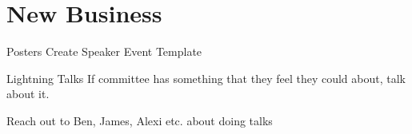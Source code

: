 \documentclass[11pt,hacksoc]{meetingmins}
\begin{document}
\section{New Business}
\begin{items}
	\item
	Posters
		\subitem
		Create Speaker Event Template
		
		\subitem
		
	\item
	Lightning Talks
		\subitem
		If committee has something that they feel they could about, talk about it.
		
		\subitem
		Reach out to Ben, James, Alexi etc. about doing talks
\end{items}

\vspace{1em}
\end{document}

